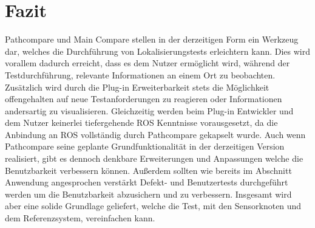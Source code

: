\chapter{Fazit}
\label{sec:conclusion}
Pathcompare und Main Compare stellen in der derzeitigen Form ein Werkzeug dar, welches die
Durchführung von Lokalisierungstests erleichtern kann. Dies wird vorallem
dadurch erreicht, dass es dem Nutzer ermöglicht wird, während der Testdurchführung, relevante
Informationen an einem Ort zu beobachten. Zusätzlich wird durch die Plug-in
Erweiterbarkeit stets die Möglichkeit offengehalten auf neue Testanforderungen
zu reagieren oder Informationen andersartig zu visualisieren. Gleichzeitig
werden beim Plug-in Entwickler und dem Nutzer keinerlei tiefergehende ROS
Kenntnisse vorausgesetzt, da die Anbindung an ROS vollständig durch Pathcompare
gekapselt wurde. Auch wenn Pathcompare seine geplante Grundfunktionalität in der
derzeitigen Version realisiert, gibt es dennoch denkbare Erweiterungen und
Anpassungen welche die Benutzbarkeit verbessern können. 
Außerdem sollten wie bereits im Abschnitt Anwendung angesprochen verstärkt
Defekt- und Benutzertests durchgeführt werden um die Benutzbarkeit abzusichern
und zu verbessern. Insgesamt wird aber eine solide Grundlage geliefert,
welche die Test, mit den Sensorknoten und dem Referenzsystem, vereinfachen kann.

